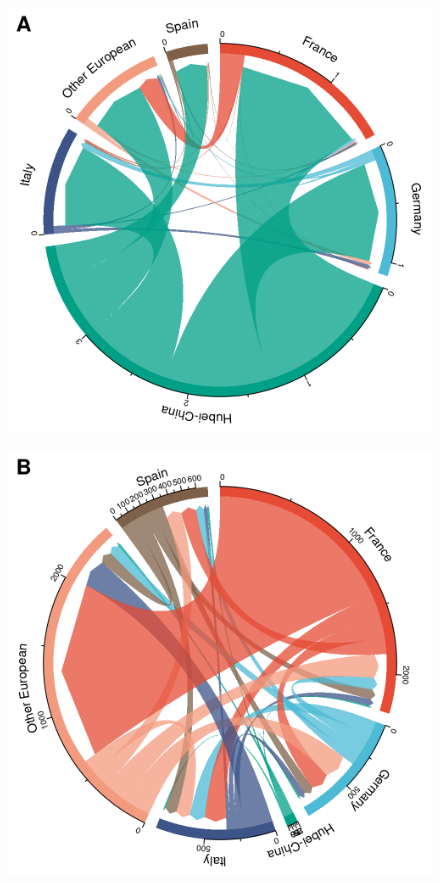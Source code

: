 \documentclass[12pt,]{article}
\begin{document}
\begin{figure}[!tbp]
  \centering

  \begin{minipage}[t]{0.4\textwidth}
  \includegraphics[width=\textwidth]{201030_europe3_figtraj09a.png}
  \label{fig:migs1}
  \end{minipage}
  \begin{minipage}[t]{0.4\textwidth}
  \includegraphics[width=\textwidth]{201030_europe3_figtraj09b.png}

\end{minipage}
\end{figure}
\end{document}
